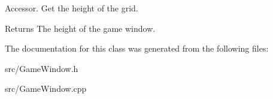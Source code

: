Accessor. Get the height of the grid. 

\begin{DoxyReturn}{Returns}
The height of the game window. 
\end{DoxyReturn}


The documentation for this class was generated from the following files\+:\begin{DoxyCompactItemize}
\item 
src/Game\+Window.\+h\item 
src/Game\+Window.\+cpp\end{DoxyCompactItemize}
